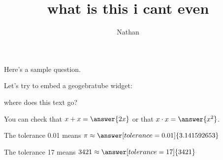 \documentclass{ximera}
\title{what is this i cant even}
\author{Nathan}
\begin{document}
\maketitle

Here's a sample question.

\begin{problem}
\begin{multipleChoice}
\end{multipleChoice}
\end{problem}

Let's try to embed a geogebratube widget:




where does this text go?

\begin{problem}
   You can check that $x + x = \answer{2x}$ or that $x \cdot x = \answer{x^2}$.
\end{problem}

\begin{problem}
   The tolerance 0.01 means $\pi \approx \answer[tolerance=0.01]{3.141592653}$
\end{problem}

\begin{problem}
   The tolerance 17 means $3421 \approx \answer[tolerance=17]{3421}$
\end{problem}
\end{document}
